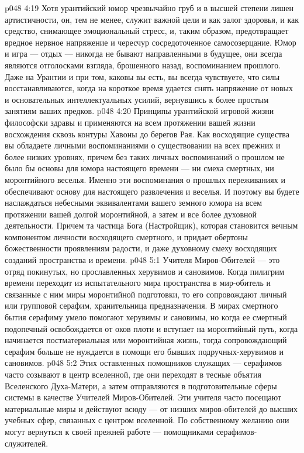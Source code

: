 \vs p048 4:19 \pc Хотя урантийский юмор чрезвычайно груб и в высшей степени лишен артистичности, он, тем не менее, служит важной цели и как залог здоровья, и как средство, снимающее эмоциональный стресс, и, таким образом, предотвращает вредное нервное напряжение и чересчур сосредоточенное самосозерцание. Юмор и игра --- отдых --- никогда не бывают направленными в будущее, они всегда являются отголосками взгляда, брошенного назад, воспоминанием прошлого. Даже на Урантии и при том, каковы вы есть, вы всегда чувствуете, что силы восстанавливаются, когда на короткое время удается снять напряжение от новых и основательных интеллектуальных усилий, вернувшись к более простым занятиям ваших предков.
\vs p048 4:20 Принципы урантийской игровой жизни философски здравы и применяются на всем протяжении вашей жизни восхождения сквозь контуры Хавоны до берегов Рая. Как восходящие существа вы обладаете личными воспоминаниями о существовании на всех прежних и более низких уровнях, причем без таких личных воспоминаний о прошлом не было бы основы для юмора настоящего времени --- ни смеха смертных, ни моронтийного веселья. Именно эти воспоминания о прошлых переживаниях и обеспечивают основу для настоящего развлечения и веселья. И поэтому вы будете наслаждаться небесными эквивалентами вашего земного юмора на всем протяжении вашей долгой моронтийной, а затем и все более духовной деятельности. Причем та частица Бога (Настройщик), которая становится вечным компонентом личности восходящего смертного, и придает обертоны божественности проявлениям радости, и даже духовному смеху восходящих созданий пространства и времени.
\vs p048 5:1 Учителя Миров\hyp{}Обителей --- это отряд покинутых, но прославленных херувимов и сановимов. Когда пилигрим времени переходит из испытательного мира пространства в мир\hyp{}обитель и связанные с ним миры моронтийной подготовки, то его сопровождают личный или групповой серафим, хранительница предназначения. В мирах смертного бытия серафиму умело помогают херувимы и сановимы, но когда ее смертный подопечный освобождается от оков плоти и вступает на моронтийный путь, когда начинается постматериальная или моронтийная жизнь, тогда сопровождающий серафим больше не нуждается в помощи его бывших подручных\hyp{}херувимов и сановимов.
\vs p048 5:2 Этих оставленных помощников служащих --- серафимов часто созывают в центр вселенной, где они переходят в тесные объятия Вселенского Духа\hyp{}Матери, а затем отправляются в подготовительные сферы системы в качестве Учителей Миров\hyp{}Обителей. Эти учителя часто посещают материальные миры и действуют всюду --- от низших миров\hyp{}обителей до высших учебных сфер, связанных с центром вселенной. По собственному желанию они могут вернуться к своей прежней работе --- помощниками серафимов\hyp{}служителей.
